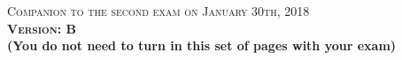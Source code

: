 \documentclass{docist}
\begin{document}
\thispagestyle{empty}

\begin{center}
  {\Large \textsc{Companion to the second exam on January 30th, 2018\\[2ex]
  \textbf{Version: B}\\[2ex]}}
  {\normalsize  \textbf{(You do not need to turn in this set of pages with your exam)}}
\end{center}






\qAggregateTwo



\qAvailabilityTwo



\qPerformanceTwo



\qMicroservicesExamTwo



\qModifiabilityExamTwo



\qDVDCatalogMobile



\qGraphiteTwo



\qWorkAssigment



\qScalableArchitectureOne



\qWebAppsTwo



\qDVDTwo



\qDataModel


\qSOA



\qAdventureBuilderTwo



\qFenixTwo



\qPulseTwo



\qOrderPadTwo



\qModuleViewtypeExamTwo



\qPipesFilters



\qComponentAndConnectorViewtypeTwo
\end{document}
